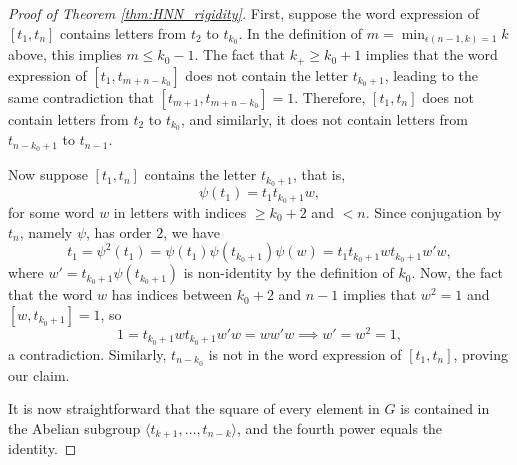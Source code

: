 \documentclass[10pt,a4paper]{amsart}
\begin{document}
\begin{proof}[Proof of Theorem \ref{thm:HNN_rigidity}]
    First, suppose the word expression of $[t_1,t_n]$ contains letters from $t_2$ to $t_{k_0}$. In the definition of $m = \min_{\epsilon(n-1,k) = 1} k$ above, this implies $m\leq k_0 - 1$. The fact that $k_+\geq k_0+1$ implies that the word expression of $[t_1,t_{m+n-k_0}]$ does not contain the letter $t_{k_0+1}$, leading to the same contradiction that $[t_{m+1},t_{m+n-k_0}] = 1$. Therefore, $[t_1,t_n]$ does not contain letters from $t_2$ to $t_{k_0}$, and similarly, it does not contain letters from $t_{n-k_0+1}$ to $t_{n-1}$.
    
    Now suppose $[t_1,t_n]$ contains the letter $t_{k_0+1}$, that is,
    \[
        \psi(t_1) = t_1t_{k_0+1}w,
    \]
    for some word $w$ in letters with indices $\geq k_0+2$ and $<n$. Since conjugation by $t_n$, namely $\psi$, has order $2$, we have
    \[
        t_1 = \psi^2(t_1) = \psi(t_1)\psi(t_{k_0+1})\psi(w) = t_1t_{k_0+1}wt_{k_0+1}w'w,
    \]
    where $w' = t_{k_0+1}\psi(t_{k_0+1})$ is non-identity by the definition of $k_0$. Now, the fact that the word $w$ has indices between $k_0+2$ and $n-1$ implies that $w^2 = 1$ and $[w,t_{k_0+1}] = 1$, so
    \[
        1 = t_{k_0+1}wt_{k_0+1}w'w = ww'w\implies w' = w^2 = 1,
    \]
    a contradiction. Similarly, $t_{n-k_0}$ is not in the word expression of $[t_1,t_n]$, proving our claim.
    
    It is now straightforward that the square of every element in $G$ is contained in the Abelian subgroup $\langle t_{k+1},\dots, t_{n-k}\rangle$, and the fourth power equals the identity.
\end{proof}
\end{document}
